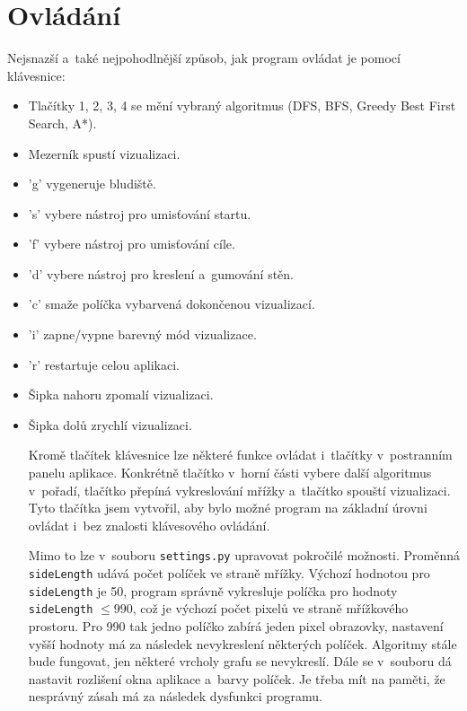 \documentclass[12pt]{report}			%
\begin{document}
			\section{Ovládání}
			Nejsnazší a~také nejpohodlnější způsob, jak program ovládat je pomocí klávesnice:
			\begin{itemize}
			
			\setlength\itemsep{0.01mm}
			\item Tlačítky 1, 2, 3, 4 se mění vybraný algoritmus (DFS, BFS, Greedy Best First Search, A*).
\item Mezerník spustí vizualizaci.
\item 'g' vygeneruje bludiště.
\item 's' vybere nástroj pro umisťování startu.
\item 'f' vybere nástroj pro umisťování cíle.
\item 'd' vybere nástroj pro kreslení a~gumování stěn.
\item 'c' smaže políčka vybarvená dokončenou vizualizací.
\item 'i' zapne/vypne barevný mód vizualizace.
\item 'r' restartuje celou aplikaci.
\item Šipka nahoru zpomalí vizualizaci.
\item Šipka dolů zrychlí vizualizaci.

			Kromě tlačítek klávesnice lze některé funkce ovládat i~tlačítky v~postranním panelu aplikace. Konkrétně tlačítko v~horní části vybere další algoritmus v~pořadí, tlačítko  přepíná vykreslování mřížky a~tlačítko  spouští vizualizaci. Tyto tlačítka jsem vytvořil, aby bylo možné program na základní úrovni ovládat i~bez znalosti klávesového ovládání.
			
			
			Mimo to lze v~souboru \texttt{settings.py} upravovat pokročilé možnosti. Proměnná \texttt{sideLength} udává počet políček ve straně mřížky. Výchozí hodnotou pro \texttt{sideLength} je 50, program správně vykresluje políčka pro hodnoty \texttt{sideLength} $\leq 990$, což je výchozí počet pixelů ve straně mřížkového prostoru. Pro 990 tak jedno políčko zabírá jeden pixel obrazovky, nastavení vyšší hodnoty má za následek nevykreslení některých políček. Algoritmy stále bude fungovat, jen některé vrcholy grafu se nevykreslí.
			Dále se v~souboru dá nastavit rozlišení okna aplikace a~barvy políček. Je třeba mít na paměti, že nesprávný zásah má za následek dysfunkci programu.
			\end{itemize}
\end{document}
